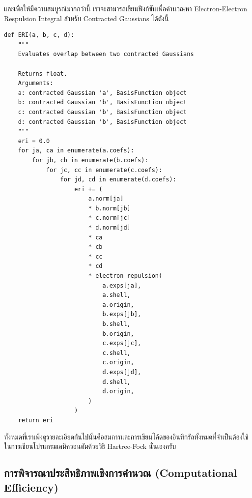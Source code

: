 \vspace{5pt}

\noindent และเพื่อให้มีความสมบูรณ์มากกว่านี้ เราจะสามารถเขียนฟังก์ชันเพื่อคำนวณหา Electron-Electron Respulsion Integral
สำหรับ Contracted Gaussians ได้ดังนี้

\vspace{5pt}

\begin{lstlisting}[style=MyPython]
def ERI(a, b, c, d):
    """
    Evaluates overlap between two contracted Gaussians

    Returns float.
    Arguments:
    a: contracted Gaussian 'a', BasisFunction object
    b: contracted Gaussian 'b', BasisFunction object
    c: contracted Gaussian 'b', BasisFunction object
    d: contracted Gaussian 'b', BasisFunction object
    """
    eri = 0.0
    for ja, ca in enumerate(a.coefs):
        for jb, cb in enumerate(b.coefs):
            for jc, cc in enumerate(c.coefs):
                for jd, cd in enumerate(d.coefs):
                    eri += (
                        a.norm[ja]
                        * b.norm[jb]
                        * c.norm[jc]
                        * d.norm[jd]
                        * ca
                        * cb
                        * cc
                        * cd
                        * electron_repulsion(
                            a.exps[ja],
                            a.shell,
                            a.origin,
                            b.exps[jb],
                            b.shell,
                            b.origin,
                            c.exps[jc],
                            c.shell,
                            c.origin,
                            d.exps[jd],
                            d.shell,
                            d.origin,
                        )
                    )
    return eri
\end{lstlisting}

\vspace{5pt}

ทั้งหมดที่เราเพิ่งดูรายละเอียดกันไปนั้นคือสมการและการเขียนโค้ดของอินทิกรัลทั้งหมดที่จำเป็นต้องใช้ในการเขียนโปรแกรมเคมีควอนตัมด้วยวิธี
Hartree-Fock นั่นเองครับ

\subsection{การพิจารณาประสิทธิภาพเชิงการคำนวณ (Computational Efficiency)}

